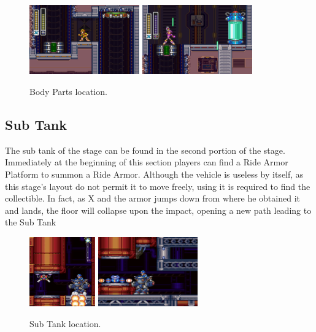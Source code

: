 \begin{figure}[htp]
	\centering
	\includegraphics[height=3cm]{figures/X3/Volt_catfish/Armor_1.png}
	\includegraphics[height=3cm]{figures/X3/Volt_catfish/Armor_2.png}
	\caption{Body Parts location.}
\end{figure}

\subsection{Sub Tank}
The sub tank of the stage can be found in the second portion of the stage. Immediately at the beginning of this section players can find a Ride Armor Platform to summon a Ride Armor. Although the vehicle is useless by itself, as this stage's layout do not permit it to move freely, using it is required to find the collectible. In fact, as X and the armor jumps down from where he obtained it and lands, the floor will collapse upon the impact, opening a new path leading to the Sub Tank
\begin{figure}[htp]
	\centering
	\includegraphics[height=3cm]{figures/X3/Volt_catfish/tank_1.jpg}
	\includegraphics[height=3cm]{figures/X3/Volt_catfish/tank_2.jpg}
	\caption{Sub Tank location.}
\end{figure}

